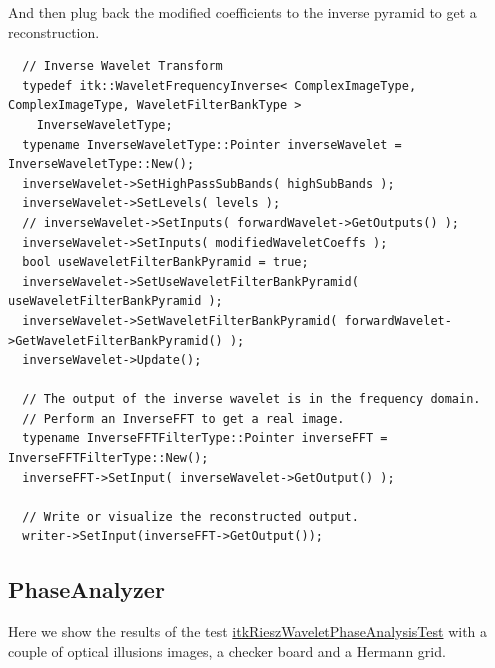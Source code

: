 And then plug back the modified coefficients to the inverse pyramid to get a reconstruction.
\begin{verbatim}
  // Inverse Wavelet Transform
  typedef itk::WaveletFrequencyInverse< ComplexImageType, ComplexImageType, WaveletFilterBankType >
    InverseWaveletType;
  typename InverseWaveletType::Pointer inverseWavelet = InverseWaveletType::New();
  inverseWavelet->SetHighPassSubBands( highSubBands );
  inverseWavelet->SetLevels( levels );
  // inverseWavelet->SetInputs( forwardWavelet->GetOutputs() );
  inverseWavelet->SetInputs( modifiedWaveletCoeffs );
  bool useWaveletFilterBankPyramid = true;
  inverseWavelet->SetUseWaveletFilterBankPyramid( useWaveletFilterBankPyramid );
  inverseWavelet->SetWaveletFilterBankPyramid( forwardWavelet->GetWaveletFilterBankPyramid() );
  inverseWavelet->Update();

  // The output of the inverse wavelet is in the frequency domain.
  // Perform an InverseFFT to get a real image.
  typename InverseFFTFilterType::Pointer inverseFFT = InverseFFTFilterType::New();
  inverseFFT->SetInput( inverseWavelet->GetOutput() );

  // Write or visualize the reconstructed output.
  writer->SetInput(inverseFFT->GetOutput());

\end{verbatim}

\subsection{PhaseAnalyzer}

Here we show the results of the test \href{https://github.com/phcerdan/ITKIsotropicWavelets/blob/5c9f8db0718164675eecd6b134e66d4015394ff8/test/itkRieszWaveletPhaseAnalysisTest.cxx}{itkRieszWaveletPhaseAnalysisTest} with a couple of optical illusions images, a checker board and a Hermann grid.

